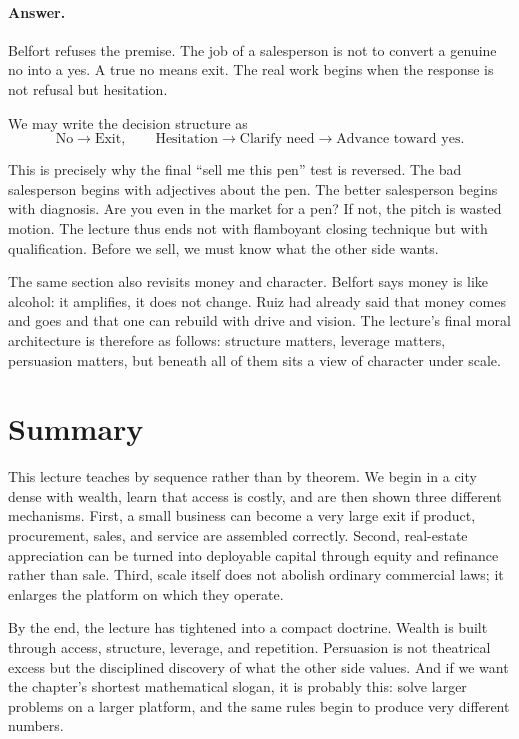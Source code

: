 \paragraph{Answer.}
Belfort refuses the premise. The job of a salesperson is not to convert a genuine no into a yes. A true no means exit. The real work begins when the response is not refusal but hesitation.

We may write the decision structure as
\begin{equation}
\text{No} \longrightarrow \text{Exit},
\qquad
\text{Hesitation} \longrightarrow \text{Clarify need} \longrightarrow \text{Advance toward yes}.
\end{equation}

This is precisely why the final ``sell me this pen'' test is reversed. The bad salesperson begins with adjectives about the pen. The better salesperson begins with diagnosis. Are you even in the market for a pen? If not, the pitch is wasted motion. The lecture thus ends not with flamboyant closing technique but with qualification. Before we sell, we must know what the other side wants.

The same section also revisits money and character. Belfort says money is like alcohol: it amplifies, it does not change. Ruiz had already said that money comes and goes and that one can rebuild with drive and vision. The lecture's final moral architecture is therefore as follows: structure matters, leverage matters, persuasion matters, but beneath all of them sits a view of character under scale.

\section{Summary}

This lecture teaches by sequence rather than by theorem. We begin in a city dense with wealth, learn that access is costly, and are then shown three different mechanisms. First, a small business can become a very large exit if product, procurement, sales, and service are assembled correctly. Second, real-estate appreciation can be turned into deployable capital through equity and refinance rather than sale. Third, scale itself does not abolish ordinary commercial laws; it enlarges the platform on which they operate.

By the end, the lecture has tightened into a compact doctrine. Wealth is built through access, structure, leverage, and repetition. Persuasion is not theatrical excess but the disciplined discovery of what the other side values. And if we want the chapter's shortest mathematical slogan, it is probably this: solve larger problems on a larger platform, and the same rules begin to produce very different numbers.